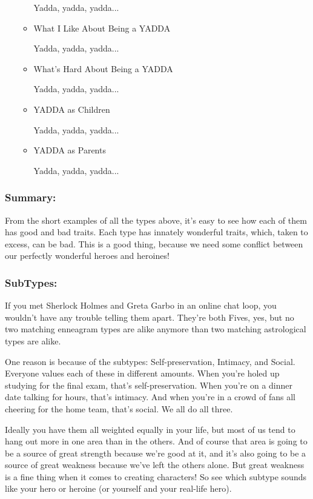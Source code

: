 \documentclass[openleft,oneside,showtrims]{memoir}
\begin{document}
\begin{itemize}
\begin{itemize}
Yadda, yadda, yadda...

\item What I Like About Being a YADDA
\label{sec:orge1b62ac}

Yadda, yadda, yadda...

\item What's Hard About Being a YADDA
\label{sec:orge58f867}

Yadda, yadda, yadda...

\item YADDA as Children
\label{sec:orgd35d62c}

Yadda, yadda, yadda...

\item YADDA as Parents
\label{sec:orgc59c70e}

Yadda, yadda, yadda...
\end{itemize}
\end{itemize}

\subsubsection*{Summary:}
\label{sec:org067980c}

From the short examples of all the types above, it’s easy to see how each of them has good and bad traits.  Each type has innately wonderful traits, which, taken to excess, can be bad.  This is a good thing, because we need some conflict between our perfectly wonderful heroes and heroines!

\subsubsection*{SubTypes:}
\label{sec:org439e46e}

If you met Sherlock Holmes and Greta Garbo in an online chat loop, you wouldn't have any trouble telling them apart. They're both Fives, yes, but no two matching enneagram types are alike anymore than two matching astrological types are alike.

One reason is because of the subtypes: Self-preservation, Intimacy, and Social. Everyone values each of these in different amounts. When you're holed up studying for the final exam, that's self-preservation. When you're on a dinner date talking for hours, that's intimacy. And when you're in a crowd of fans all cheering for the home team, that's social. We all do all three.

Ideally you have them all weighted equally in your life, but most of us tend to hang out more in one area than in the others. And of course that area is going to be a source of great strength because we're good at it, and it's also going to be a source of great weakness because we've left the others alone. But great weakness is a fine thing when it comes to creating characters! So see which subtype sounds like your hero or heroine (or yourself and your real-life hero).
\end{document}
